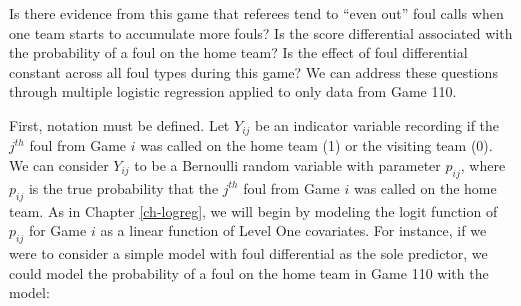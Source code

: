 \documentclass[
]{krantz}
\begin{document}
\begin{table}

\caption{\label{tab:table3chp11}Key variables from the March 3, 2010, game featuring Virginia at Boston College (Game 110).}
\centering
{}
\end{table}

Is there evidence from this game that referees tend to ``even out'' foul calls when one team starts to accumulate more fouls? Is the score differential associated with the probability of a foul on the home team? Is the effect of foul differential constant across all foul types during this game? We can address these questions through multiple logistic regression applied to only data from Game 110.

First, notation must be defined. Let \(Y_{ij}\) be an indicator variable recording if the \(j^{th}\) foul from Game \(i\) was called on the home team (1) or the visiting team (0). We can consider \(Y_{ij}\) to be a Bernoulli random variable with parameter \(p_{ij}\), where \(p_{ij}\) is the true probability that the \(j^{th}\) foul from Game \(i\) was called on the home team. As in Chapter \ref{ch-logreg}, we will begin by modeling the logit function of \(p_{ij}\) for Game \(i\) as a linear function of Level One covariates. For instance, if we were to consider a simple model with foul differential as the sole predictor, we could model the probability of a foul on the home team in Game 110 with the model:
\end{document}
